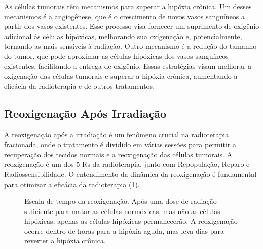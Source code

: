 \documentclass[11pt,a4paper]{article}
\begin{document}
	As células tumorais têm mecanismos para superar a hipóxia crônica. Um desses mecanismos é a angiogênese, que é o crescimento de novos vasos sanguíneos a partir dos vasos existentes. Esse processo visa fornecer um suprimento de oxigênio adicional às células hipóxicas, melhorando sua oxigenação e, potencialmente, tornando-as mais sensíveis à radiação. Outro mecanismo é a redução do tamanho do tumor, que pode aproximar as células hipóxicas dos vasos sanguíneos existentes, facilitando a entrega de oxigênio. Essas estratégias visam melhorar a oxigenação das células tumorais e superar a hipóxia crônica, aumentando a eficácia da radioterapia e de outros tratamentos.

\subsection*{Reoxigenação Após Irradiação}

	A reoxigenação após a irradiação é um fenômeno crucial na radioterapia fracionada, onde o tratamento é dividido em várias sessões para permitir a recuperação dos tecidos normais e a reoxigenação das células tumorais. A reoxigenação é um dos 5 Rs da radioterapia, junto com Repopulação, Reparo e Radiossensibilidade. O entendimento da dinâmica da reoxigenação é fundamental para otimizar a eficácia da radioterapia (\ref{fig:reoxigenacaoAposIrradiacao}).

	\begin{figure}[h]
		\centering
		\caption{Escala de tempo da reoxigenação. Após uma dose de radiação suficiente para matar as células normóxicas, mas não as células hipóxicas, apenas as células hipóxicas permanecerão. A reoxigenação ocorre dentro de horas para a hipóxia aguda, mas leva dias para reverter a hipóxia crônica.}
		\label{fig:reoxigenacaoAposIrradiacao}
	\end{figure}
\end{document}

